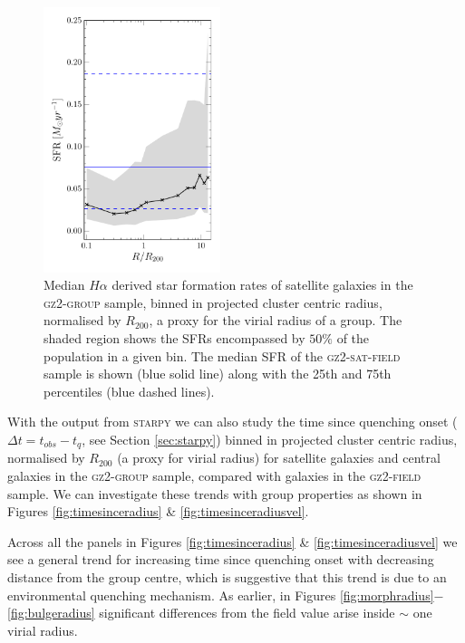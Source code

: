 \documentclass[useAMS,usenatbib]{mn2e}
\def\starpy ~{\textsc{starpy}}
\begin{document}
{\begin{figure}
\includegraphics[width=0.46\textwidth]{sfr_trend_with_log_radius_field_matched_blue_dashed_hlines_gomez_03_rv_not_r200.pdf}
\caption{Median $H\alpha$ derived star formation rates of satellite galaxies in the \textsc{gz2-group} sample, binned in projected cluster centric radius, normalised by $R_{200}$, a proxy for the virial radius of a group.  The shaded region shows the SFRs encompassed by $50\%$ of the population in a given bin. The median SFR of the \textsc{gz2-sat-field} sample is shown (blue solid line) along with the 25th and 75th percentiles (blue dashed lines).}
\label{fig:sfrradius}
\end{figure}


With the output from \starpy~ we can also study the time since quenching onset ($\Delta t = t_{obs} - t_{q}$, see Section \ref{sec:starpy}) binned in projected cluster centric radius, normalised by $R_{200}$ (a proxy for virial radius) for satellite galaxies and central galaxies in the \textsc{gz2-group} sample, compared with galaxies in the \textsc{gz2-field} sample. We can investigate these trends with group properties as shown in Figures \ref{fig:timesinceradius} \& \ref{fig:timesinceradiusvel}. 

Across all the panels in Figures \ref{fig:timesinceradius} \& \ref{fig:timesinceradiusvel} we see a general trend for increasing time since quenching onset with decreasing distance from the group centre, which is suggestive that this trend is due to an environmental quenching mechanism. As earlier, in Figures \ref{fig:morphradius}$-$\ref{fig:bulgeradius} significant differences from the field value arise inside $\sim$ one virial radius. 

}
\end{document}
